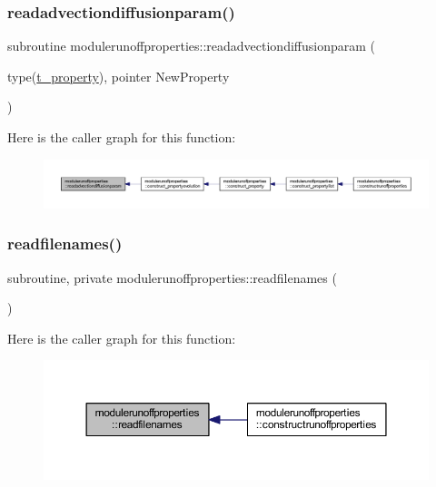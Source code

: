 \subsubsection{\texorpdfstring{readadvectiondiffusionparam()}{readadvectiondiffusionparam()}}
{\footnotesize\ttfamily subroutine modulerunoffproperties\+::readadvectiondiffusionparam (\begin{DoxyParamCaption}\item[{type(\mbox{\hyperlink{structmodulerunoffproperties_1_1t__property}{t\+\_\+property}}), pointer}]{New\+Property }\end{DoxyParamCaption})\hspace{0.3cm}{\ttfamily [private]}}

Here is the caller graph for this function\+:\nopagebreak
\begin{figure}[H]
\begin{center}
\leavevmode
\includegraphics[width=350pt]{namespacemodulerunoffproperties_ade7661d1679610044a3f568f06610532_icgraph}
\end{center}
\end{figure}
\mbox{\label{namespacemodulerunoffproperties_afd2d4bbe5b2bb177301ac47d42f33f02}} 
\subsubsection{\texorpdfstring{readfilenames()}{readfilenames()}}
{\footnotesize\ttfamily subroutine, private modulerunoffproperties\+::readfilenames (\begin{DoxyParamCaption}{ }\end{DoxyParamCaption})\hspace{0.3cm}{\ttfamily [private]}}

Here is the caller graph for this function\+:\nopagebreak
\begin{figure}[H]
\begin{center}
\leavevmode
\includegraphics[width=350pt]{namespacemodulerunoffproperties_afd2d4bbe5b2bb177301ac47d42f33f02_icgraph}
\end{center}
\end{figure}
\mbox{\label{namespacemodulerunoffproperties_a17a988c6d85ad5ccca32ec7064ede8f2}} 
